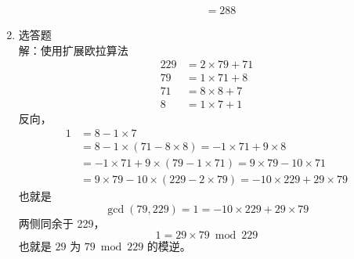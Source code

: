 \documentclass{sjtuarticle}
\begin{document}
\begin{enumerate}
\begin{enumerate}
\begin{align*}
            &= 288
        \end{align*}
    \end{enumerate}
    \item 选答题\\
        解：使用扩展欧拉算法
        \begin{align*}
            229 &= 2\times 79 + 71 \\
            79 &= 1\times 71 + 8\\
            71&= 8\times 8 + 7 \\
            8&= 1\times 7+1
        \end{align*}
        反向，
        \begin{align*}
            1&=8-1\times 7 \\
            &=8-1\times(71-8\times 8)=-1\times 71+9\times 8\\
            &=-1\times 71+9\times (79-1\times 71) = 9\times 79-10\times 71\\
            &=9\times 79-10\times (229-2\times 79)=-10\times 229+29\times 79
        \end{align*}
        也就是
        \begin{equation*}
            \gcd(79,229)=1=-10\times 229+29\times 79
        \end{equation*}
        两侧同余于 229，
        \begin{equation*}
            1 = 29\times 79\bmod 229
        \end{equation*}
        也就是 $29$ 为 $79\bmod 229$ 的模逆。
\end{enumerate}
\end{document}
